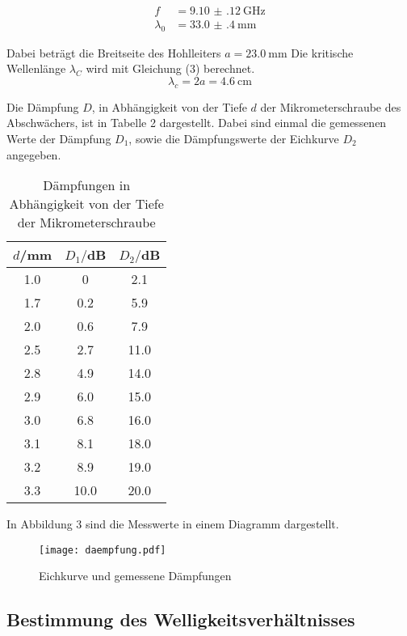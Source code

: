 \begin{align*}
  f &= \SI{9.10(12)}{\giga\hertz} \\
  \lambda_{0} &= \SI{33.0(4)}{\milli\meter}
\end{align*}

Dabei beträgt die Breitseite des Hohlleiters $a= \SI{23.0}{\milli\meter}$
Die kritische Wellenlänge $\lambda_C$ wird mit Gleichung (3) berechnet.
\begin{equation*}
  \lambda_c = 2a = \SI{4.6}{\centi\meter}
\end{equation*}

Die Dämpfung $D$, in Abhängigkeit von der Tiefe $d$ der Mikrometerschraube des Abschwächers, ist in Tabelle 2
dargestellt. Dabei sind einmal die gemessenen Werte der Dämpfung $D_1$, sowie die Dämpfungswerte der
Eichkurve $D_2$ angegeben.


\begin{table}[H]
  \centering
  \caption{Dämpfungen in Abhängigkeit von der Tiefe der Mikrometerschraube}
  \label{tab:Parameter}
  \begin{tabular}{c c c}
    \toprule
    $d$/mm & $D_1/$dB & $D_2/$dB\\
    \midrule
    1.0 &  0  & 2.1    \\
    1.7 &  0.2  & 5.9    \\
    2.0 &  0.6  & 7.9    \\
    2.5 &  2.7  & 11.0    \\
    2.8 &  4.9  & 14.0    \\
    2.9 &  6.0  & 15.0    \\
    3.0 &  6.8  & 16.0    \\
    3.1 &  8.1  & 18.0    \\
    3.2 &  8.9  & 19.0    \\
    3.3 &  10.0 & 20.0    \\
    \bottomrule
  \end{tabular}
\end{table}

In Abbildung 3 sind die Messwerte in einem Diagramm dargestellt.

\begin{figure}
  \centering
  \texttt{[image: daempfung.pdf]}
  \caption{Eichkurve und gemessene Dämpfungen}
  \label{fig:plot}
\end{figure}

\subsection{Bestimmung des Welligkeitsverhältnisses}

